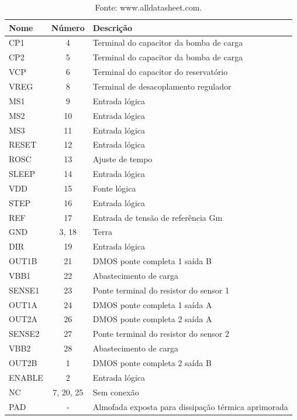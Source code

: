 \begin{table}[H]
    \centering
    \caption{Lista de terminais do driver A4988.}
    \begin{tabular}{lcl}
        \hline
        \textbf{Nome} & \textbf{Número} & \textbf{Descrição}\\
        \hline
         CP1 & 4 & Terminal do capacitor da bomba de carga\\
         CP2 & 5 & Terminal do capacitor da bomba de carga\\
         VCP & 6 & Terminal do capacitor do reservatório\\
         VREG & 8 & Terminal de desacoplamento regulador\\
         MS1 & 9 & Entrada lógica\\
         MS2 & 10 & Entrada lógica\\
         MS3 & 11 & Entrada lógica\\
         RESET & 12 & Entrada lógica\\
         ROSC & 13 & Ajuste de tempo\\
         SLEEP & 14 & Entrada lógica\\
         VDD & 15 & Fonte lógica\\
         STEP & 16 & Entrada lógica\\
         REF & 17 & Entrada de tensão de referência Gm\\
         GND & 3, 18 & Terra\\
         DIR & 19 & Entrada lógica\\
         OUT1B & 21 & DMOS ponte completa 1 saída B\\
         VBB1 & 22 & Abastecimento de carga\\
         SENSE1 & 23 & Ponte terminal do resistor do sensor 1\\
         OUT1A & 24 & DMOS ponte completa 1 saída A\\
         OUT2A & 26 & DMOS ponte completa 2 saída A\\
         SENSE2 & 27 & Ponte terminal do resistor do sensor 2\\
         VBB2 & 28 & Abastecimento de carga\\
         OUT2B & 1 & DMOS ponte completa 2 saída B\\
         ENABLE & 2 & Entrada lógica\\
         NC & 7, 20, 25 & Sem conexão\\
         PAD & - & Almofada exposta para dissipação térmica aprimorada\\
        \hline       
    \end{tabular}
    \caption*{Fonte: www.alldatasheet.com.}
    \label{tab:pdriverportas}
\end{table}


